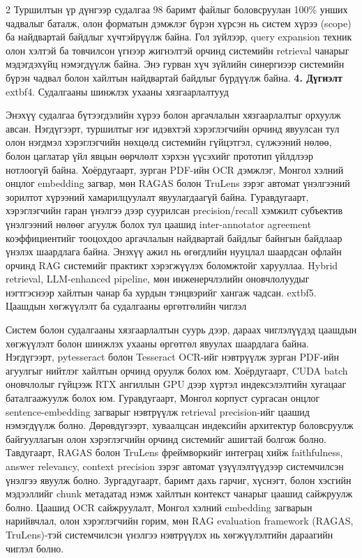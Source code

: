 \documentclass[11pt,a4paper]{article}
\begin{document}
\begin{multicols*}{2}
Туршилтын үр дүнгээр судалгаа 98 баримт файлыг боловсруулан 100\% унших чадвалыг баталж, олон форматын дэмжлэг бүрэн хүрсэн нь систем хүрээ (scope) ба найдвартай байдлыг хүчтэйрүүлж байна. Гол зүйлээр, query expansion техник олон хэлтэй ба товчилсон үгнээр жигнэлтэй орчинд системийн retrieval чанарыг мэдэгдэхүйц нэмэгдүүлж байна. Энэ гурван хүч зүйлийн синергиээр системийн бүрэн чадвал болон хайлтын найдвартай байдлыг бүрдүүлж байна.
\noindent\textbf{4. Дүгнэлт}
      extbf{4. Судалгааны шинжлэх ухааны хязгаарлалтууд}

Энэхүү судалгаа бүтээгдэлийн хүрээ болон аргачлалын хязгаарлалтыг орхуулж авсан. Нэгдүгээрт, туршилтыг нэг идэвхтэй хэрэглэгчийн орчинд явуулсан тул олон нэгдмэл хэрэглэгчийн нөхцөлд системийн гүйцэтгэл, сүлжээний нөлөө, болон цаглатар үйл явцын өөрчлөлт хэрхэн үүсэхийг прототип үйлдлээр нотлоогүй байна. Хоёрдугаарт, зурган PDF-ийн OCR дэмжлэг, Монгол хэлний онцлог embedding загвар, мөн RAGAS болон TruLens зэрэг автомат үнэлгээний зорилтот хүрээний хамарилцуулалт явуулагдаагүй байна. Гуравдугаарт, хэрэглэгчийн гаран үнэлгээ дээр суурилсан precision/recall хэмжилт субъектив үнэлгээний нөлөөг агуулж болох тул цаашид inter-annotator agreement коэффициентийг тооцохдоо аргачлалын найдвартай байдлыг байнгын байдлаар үнэлэх шаардлага байна.
Энэхүү ажил нь өгөгдлийн нууцлал шаардсан офлайн орчинд RAG системийг практикт хэрэгжүүлэх боломжтойг харууллаа. Hybrid retrieval, LLM-enhanced pipeline, мөн инженерчлэлийн оновчлолуудыг нэгтгэснээр хайлтын чанар ба хурдын тэнцвэрийг хангаж чадсан.
      extbf{5. Цаашдын хөгжүүлэлт ба судалгааны өргөтгөлийн чиглэл}

Систем болон судалгааны хязгаарлалтын суурь дээр, дараах чиглэлүүдэд цаашдын хөгжүүлэлт болон шинжлэх ухааны өргөтгөл явуулах шаардлага байна. Нэгдүгээрт, pytesseract болон Tesseract OCR-ийг нэвтрүүлж зурган PDF-ийн агуулгыг нийтлэг хайлтын орчинд оруулж болох юм. Хоёрдугаарт, CUDA batch оновчлолыг гүйцээж RTX ангиллын GPU дээр хүртэл индексэлэлтийн хугацааг баталгаажуулж болох юм. Гуравдугаарт, Монгол корпуст сургасан онцлог sentence-embedding загварыг нэвтрүүлж retrieval precision-ийг цаашид нэмэгдүүлж болно. Дөрөвдүгээрт, хуваалцсан индексийн архитектур боловсруулж байгууллагын олон хэрэглэгчийн орчинд системийг ашигтай болгож болно. Тавдугаарт, RAGAS болон TruLens фреймворкийг интеграц хийж faithfulness, answer relevancy, context precision зэрэг автомат үзүүлэлтүүдээр системчилсэн үнэлгээ явуулж болно. Зургадугаарт, баримт дахь гарчиг, хүснэгт, болон хэсгийн мэдээллийг chunk метадатад нэмж хайлтын контекст чанарыг цаашид сайжруулж болно.
Цаашид OCR сайжруулалт, Монгол хэлний embedding загварын нарийвчлал, олон хэрэглэгчийн горим, мөн RAG evaluation framework (RAGAS, TruLens)-тэй системчилсэн үнэлгээ нэвтрүүлэх нь хөгжүүлэлтийн дараагийн чиглэл болно.


\end{multicols*}
\end{document}
